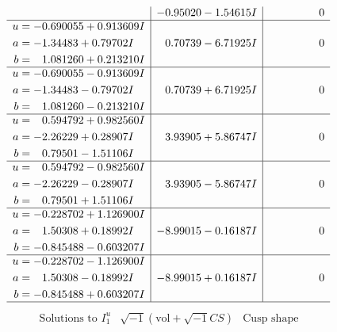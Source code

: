 \documentclass[1p]{elsarticle_modified}
\theoremstyle{definition}
\newcommand{\I}{\sqrt{-1}}
\begin{document}
$$\begin{array}{c|c|c}
 & -0.95020 - 1.54615 I & \phantom{-0.000000 } 0 \\ \hline\begin{aligned}
u &= -0.690055 + 0.913609 I \\
a &= -1.34483 + 0.79702 I \\
b &= \phantom{-}1.081260 + 0.213210 I\end{aligned}
 & \phantom{-}0.70739 - 6.71925 I & \phantom{-0.000000 } 0 \\ \hline\begin{aligned}
u &= -0.690055 - 0.913609 I \\
a &= -1.34483 - 0.79702 I \\
b &= \phantom{-}1.081260 - 0.213210 I\end{aligned}
 & \phantom{-}0.70739 + 6.71925 I & \phantom{-0.000000 } 0 \\ \hline\begin{aligned}
u &= \phantom{-}0.594792 + 0.982560 I \\
a &= -2.26229 + 0.28907 I \\
b &= \phantom{-}0.79501 - 1.51106 I\end{aligned}
 & \phantom{-}3.93905 + 5.86747 I & \phantom{-0.000000 } 0 \\ \hline\begin{aligned}
u &= \phantom{-}0.594792 - 0.982560 I \\
a &= -2.26229 - 0.28907 I \\
b &= \phantom{-}0.79501 + 1.51106 I\end{aligned}
 & \phantom{-}3.93905 - 5.86747 I & \phantom{-0.000000 } 0 \\ \hline\begin{aligned}
u &= -0.228702 + 1.126900 I \\
a &= \phantom{-}1.50308 + 0.18992 I \\
b &= -0.845488 - 0.603207 I\end{aligned}
 & -8.99015 - 0.16187 I & \phantom{-0.000000 } 0 \\ \hline\begin{aligned}
u &= -0.228702 - 1.126900 I \\
a &= \phantom{-}1.50308 - 0.18992 I \\
b &= -0.845488 + 0.603207 I\end{aligned}
 & -8.99015 + 0.16187 I & \phantom{-0.000000 } 0\\
 \hline 
 \end{array}$$\newpage$$\begin{array}{c|c|c}  
\text{Solutions to }I^u_{1}& \I (\text{vol} + \sqrt{-1}CS) & \text{Cusp shape}\\

\end{array}$$
\end{document}
